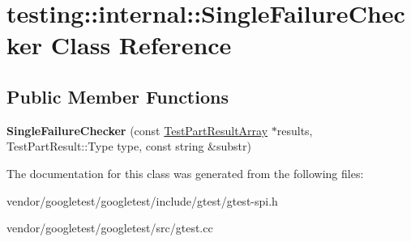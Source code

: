 \hypertarget{classtesting_1_1internal_1_1_single_failure_checker}{}\section{testing\+:\+:internal\+:\+:Single\+Failure\+Checker Class Reference}
\label{classtesting_1_1internal_1_1_single_failure_checker}
\subsection*{Public Member Functions}
\begin{DoxyCompactItemize}
\item 
\mbox{\label{classtesting_1_1internal_1_1_single_failure_checker_a6d350d385526c97c9982e928f5f8fb56}} 
{\bfseries Single\+Failure\+Checker} (const \mbox{\hyperlink{classtesting_1_1_test_part_result_array}{Test\+Part\+Result\+Array}} $\ast$results, Test\+Part\+Result\+::\+Type type, const string \&substr)
\end{DoxyCompactItemize}


The documentation for this class was generated from the following files\+:\begin{DoxyCompactItemize}
\item 
vendor/googletest/googletest/include/gtest/gtest-\/spi.\+h\item 
vendor/googletest/googletest/src/gtest.\+cc\end{DoxyCompactItemize}
